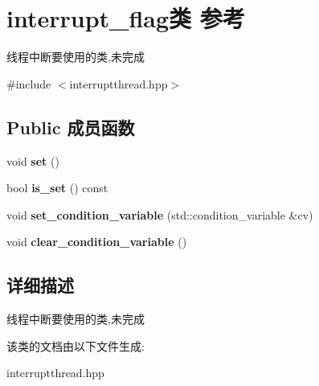 \hypertarget{classinterrupt__flag}{}\section{interrupt\+\_\+flag类 参考}
\label{classinterrupt__flag}


线程中断要使用的类,未完成  




{\ttfamily \#include $<$interruptthread.\+hpp$>$}

\subsection*{Public 成员函数}
\begin{DoxyCompactItemize}
\item 
\mbox{\label{classinterrupt__flag_a2a97873c0f9ee0ee81ee4b9f3917b274}} 
void {\bfseries set} ()
\item 
\mbox{\label{classinterrupt__flag_aee5d0cee6b88df285edaf1f418ef366e}} 
bool {\bfseries is\+\_\+set} () const
\item 
\mbox{\label{classinterrupt__flag_aef4001274efffb0ff9bcfe7c0d0f4077}} 
void {\bfseries set\+\_\+condition\+\_\+variable} (std\+::condition\+\_\+variable \&cv)
\item 
\mbox{\label{classinterrupt__flag_a9d9c6d923ff61f653697fa7bd51e2e37}} 
void {\bfseries clear\+\_\+condition\+\_\+variable} ()
\end{DoxyCompactItemize}


\subsection{详细描述}
线程中断要使用的类,未完成 

该类的文档由以下文件生成\+:\begin{DoxyCompactItemize}
\item 
interruptthread.\+hpp\end{DoxyCompactItemize}
